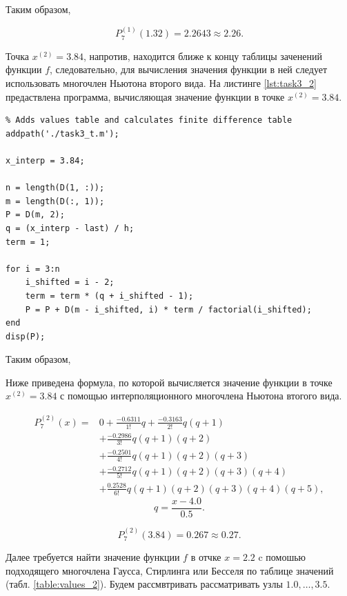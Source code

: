 Таким образом,

\[
P_7^{(1)}(1.32) = 2.2643 \approx 2.26.
\]

Точка  $x^{(2)} = 3.84$, напротив, находится ближе к концу таблицы заченений функции $f$, следовательно, для вычисления значения функции в ней следует использовать многочлен Ньютона второго вида. На листинге \ref{lst:task3_2} предаствлена программа, вычисляющая значение функции в точке $x^{(2)} = 3.84$.

\begin{listing}[H]
\caption{Вычисление значения функции $f$ в точке $x^{(2)} = 3.84$ с помощью интерполяционного многочлена Ньютона второго вида}
\vspace{-20pt}
\label{lst:task3_2}
\begin{verbatim}
% Adds values table and calculates finite difference table
addpath('./task3_t.m');

x_interp = 3.84;

n = length(D(1, :));
m = length(D(:, 1));
P = D(m, 2);
q = (x_interp - last) / h;
term = 1;

for i = 3:n
    i_shifted = i - 2;
    term = term * (q + i_shifted - 1);
    P = P + D(m - i_shifted, i) * term / factorial(i_shifted);
end
disp(P);
\end{verbatim}
\end{listing}

Таким образом,


Ниже приведена формула, по которой вычисляется значение функции в точке $x^{(2)} = 3.84$ с помощью интерполяционного многочлена Ньютона втогого вида.

\[
\begin{aligned}
P_7^{(2)}(x)={}&
0
+\frac{-0.6311}{1!}q
+\frac{-0.3163}{2!}q(q+1)\\
&+\frac{-0.2986}{3!}q(q+1)(q+2)\\
&+\frac{-0.2501}{4!}q(q+1)(q+2)(q+3)\\
&+\frac{-0.2712}{5!}q(q+1)(q+2)(q+3)(q+4)\\
&+\frac{0.2528}{6!}q(q+1)(q+2)(q+3)(q+4)(q+5),
\end{aligned}
\]
\[
q=\frac{x-4.0}{0.5}.
\]

\[
P_7^{(2)}(3.84) = 0.267 \approx 0.27.
\]

Далее требуется найти значение функции $f$ в отчке $x = 2.2$ c помошью подходящего многочлена Гаусса, Стирлинга или Бесселя по таблице значений (табл. \ref{table:values_2}). Будем рассмвтривать рассматривать узлы $1.0, \dots, 3.5$.

